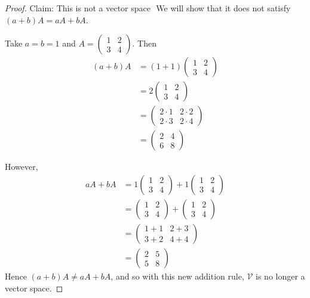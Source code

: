 \documentclass{article}
\begin{document}
\begin{proof} Claim: This is not a vector space
$ $ \newline
We will show that it does not satisfy $(a+b)A = aA+bA$.

Take $a=b=1$ and $A= \begin{pmatrix} 1 & 2 \\ 3 & 4 \end{pmatrix}$. Then
\begin{align*}
(a+b)A &= (1+1)\begin{pmatrix} 1 & 2 \\ 3 & 4 \end{pmatrix}\\
&= 2 \begin{pmatrix} 1 & 2 \\ 3 & 4 \end{pmatrix} \\
&=\begin{pmatrix} 2\cdot 1 & 2\cdot 2 \\2\cdot  3 & 2\cdot 4 \end{pmatrix}\\
&= \begin{pmatrix} 2 & 4 \\ 6 & 8 \end{pmatrix}
\end{align*}

However,
\begin{align*}
aA+bA &= 1\begin{pmatrix} 1 & 2 \\ 3 & 4 \end{pmatrix} + 1\begin{pmatrix} 1 & 2 \\ 3 & 4 \end{pmatrix} \\
&= \begin{pmatrix} 1 & 2 \\ 3 & 4 \end{pmatrix} +\begin{pmatrix} 1 & 2 \\ 3 & 4 \end{pmatrix} \\
&= \begin{pmatrix} 1+1 & 2+3 \\ 3+2 & 4+4 \end{pmatrix} \\
&= \begin{pmatrix} 2 & 5 \\ 5 & 8 \end{pmatrix}
\end{align*}
Hence $(a+b)A \ne aA+bA$, and so with this new addition rule, $\mathcal{V}$ is no longer a vector space.

\end{proof}
\end{document}

